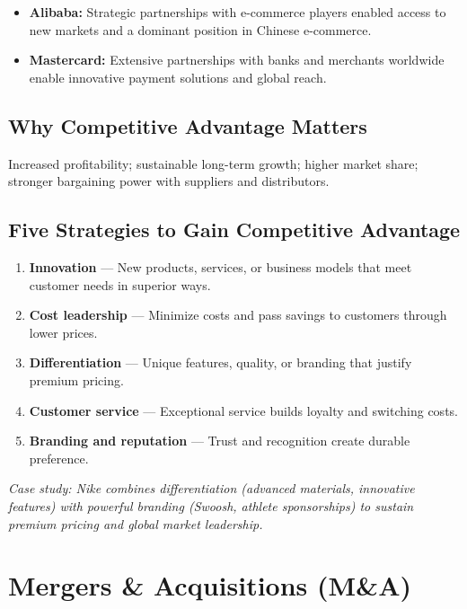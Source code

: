 \documentclass[11pt, letterpaper]{article}
\begin{document}
\begin{itemize}[leftmargin=*]
  \item \textbf{Alibaba:} Strategic partnerships with e-commerce players enabled access to new markets and a dominant position in Chinese e-commerce.
  \item \textbf{Mastercard:} Extensive partnerships with banks and merchants worldwide enable innovative payment solutions and global reach.
\end{itemize}

\subsection{Why Competitive Advantage Matters}

Increased profitability; sustainable long-term growth; higher market share; stronger bargaining power with suppliers and distributors.

\subsection{Five Strategies to Gain Competitive Advantage}

\begin{enumerate}[leftmargin=*, label=\textbf{\arabic*.}]
  \item \textbf{Innovation} --- New products, services, or business models that meet customer needs in superior ways.
  \item \textbf{Cost leadership} --- Minimize costs and pass savings to customers through lower prices.
  \item \textbf{Differentiation} --- Unique features, quality, or branding that justify premium pricing.
  \item \textbf{Customer service} --- Exceptional service builds loyalty and switching costs.
  \item \textbf{Branding and reputation} --- Trust and recognition create durable preference.
\end{enumerate}

\textit{Case study: Nike combines differentiation (advanced materials, innovative features) with powerful branding (Swoosh, athlete sponsorships) to sustain premium pricing and global market leadership.}

\newpage

\section{Mergers \& Acquisitions (M\&A)}
\end{document}
